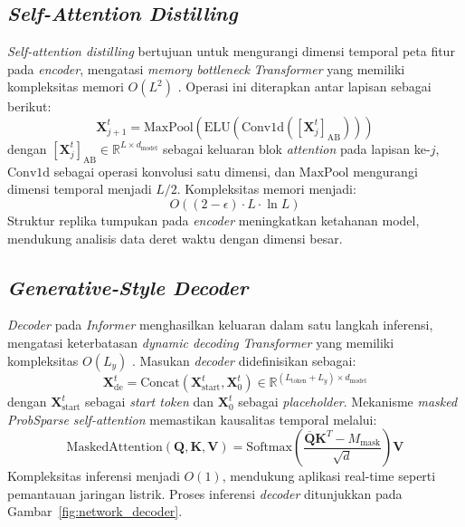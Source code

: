 \subsection{\textit{Self-Attention Distilling}}
\label{sec:distilling}

\textit{Self-attention distilling} bertujuan untuk mengurangi dimensi temporal peta fitur pada \textit{encoder}, mengatasi \textit{memory bottleneck} \textit{Transformer} yang memiliki kompleksitas memori \( O(L^2) \) \citep{Zhou2021}. Operasi ini diterapkan antar lapisan sebagai berikut:
\begin{equation}
\mathbf{X}_{j+1}^t = \text{MaxPool}\left( \text{ELU}\left( \text{Conv1d}\left( [\mathbf{X}_j^t]_{\text{AB}} \right) \right) \right)
\end{equation}
dengan \( [\mathbf{X}_j^t]_{\text{AB}} \in \mathbb{R}^{L \times d_{\text{model}}} \) sebagai keluaran blok \textit{attention} pada lapisan ke-\( j \), \( \text{Conv1d} \) sebagai operasi konvolusi satu dimensi, dan \( \text{MaxPool} \) mengurangi dimensi temporal menjadi \( L/2 \). Kompleksitas memori menjadi:
\begin{equation}
O((2-\epsilon) \cdot L \cdot \ln L)
\end{equation}
Struktur replika tumpukan pada \textit{encoder} meningkatkan ketahanan model, mendukung analisis data deret waktu dengan dimensi besar.

\subsection{\textit{Generative-Style Decoder}}
\label{sec:decoder}

\textit{Decoder} pada \textit{Informer} menghasilkan keluaran dalam satu langkah inferensi, mengatasi keterbatasan \textit{dynamic decoding} \textit{Transformer} yang memiliki kompleksitas \( O(L_y) \) \citep{Zhou2021}. Masukan \textit{decoder} didefinisikan sebagai:
\begin{equation}
\mathbf{X}_{\text{de}}^t = \text{Concat}\left( \mathbf{X}_{\text{start}}^t, \mathbf{X}_0^t \right) \in \mathbb{R}^{(L_{\text{token}} + L_y) \times d_{\text{model}}}
\end{equation}
dengan \( \mathbf{X}_{\text{start}}^t \) sebagai \textit{start token} dan \( \mathbf{X}_0^t \) sebagai \textit{placeholder}. Mekanisme \textit{masked ProbSparse self-attention} memastikan kausalitas temporal melalui:
\begin{equation}
\text{MaskedAttention}(\mathbf{Q}, \mathbf{K}, \mathbf{V}) = \text{Softmax}\left( \frac{\overline{\mathbf{Q}} \mathbf{K}^T - M_{\text{mask}}}{\sqrt{d}} \right) \mathbf{V}
\end{equation}
Kompleksitas inferensi menjadi \( O(1) \), mendukung aplikasi real-time seperti pemantauan jaringan listrik. Proses inferensi \textit{decoder} ditunjukkan pada Gambar~\ref{fig:network_decoder}.

